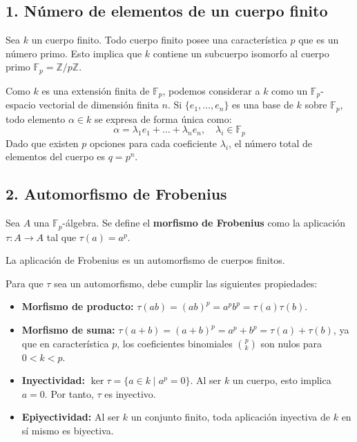 \begin{itemize}
    \subsection*{1. Número de elementos de un cuerpo finito}
Sea $k$ un cuerpo finito. Todo cuerpo finito posee una característica $p$ que es un número primo. Esto implica que $k$ contiene un subcuerpo isomorfo al cuerpo primo $\mathbb{F}_p = \mathbb{Z}/p\mathbb{Z}$. 

Como $k$ es una extensión finita de $\mathbb{F}_p$, podemos considerar a $k$ como un $\mathbb{F}_p$-espacio vectorial de dimensión finita $n$. Si $\{e_1, \dots, e_n\}$ es una base de $k$ sobre $\mathbb{F}_p$, todo elemento $\alpha \in k$ se expresa de forma única como:
\[ \alpha = \lambda_1 e_1 + \dots + \lambda_n e_n, \quad \lambda_i \in \mathbb{F}_p \]
Dado que existen $p$ opciones para cada coeficiente $\lambda_i$, el número total de elementos del cuerpo es $q = p^n$.

\subsection*{2. Automorfismo de Frobenius}
\begin{defi}
Sea $A$ una $\mathbb{F}_p$-álgebra. Se define el \textbf{morfismo de Frobenius} como la aplicación $\tau: A \to A$ tal que $\tau(a) = a^p$.
\end{defi}

\begin{prop}
La aplicación de Frobenius es un automorfismo de cuerpos finitos.
\end{prop}

\begin{dem}
Para que $\tau$ sea un automorfismo, debe cumplir las siguientes propiedades:
\begin{itemize}
    \item \textbf{Morfismo de producto:} $\tau(ab) = (ab)^p = a^p b^p = \tau(a)\tau(b)$.
    \item \textbf{Morfismo de suma:} $\tau(a+b) = (a+b)^p = a^p + b^p = \tau(a) + \tau(b)$, ya que en característica $p$, los coeficientes binomiales $\binom{p}{k}$ son nulos para $0 < k < p$.
    \item \textbf{Inyectividad:} $\ker \tau = \{a \in k \mid a^p = 0\}$. Al ser $k$ un cuerpo, esto implica $a = 0$. Por tanto, $\tau$ es inyectivo.
    \item \textbf{Epiyectividad:} Al ser $k$ un conjunto finito, toda aplicación inyectiva de $k$ en sí mismo es biyectiva.
\end{itemize}
\end{dem}


\end{itemize}
